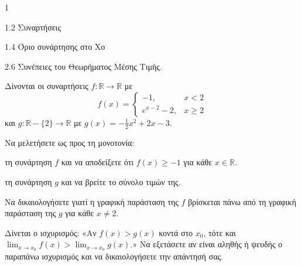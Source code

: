 \begin{ylh}{1}
    \item 1.2 Συναρτήσεις
    \item 1.4 Όριο συνάρτησης στο Χο
    \item 2.6 Συνέπειες του Θεωρήματος Μέσης Τιμής.
\end{ylh}
Δίνονται οι συναρτήσεις $f: \mathbb{R} \to \mathbb{R}$ με
\[ f(x) = \begin{cases} -1, & x < 2 \\ e^{x-2} - 2, & x \ge 2 \end{cases} \]
και $g: \mathbb{R} - \{2\} \to \mathbb{R}$ με $g(x) = -\frac{1}{2}x^2 + 2x - 3$.

\begin{alist}
\item Να μελετήσετε ως προς τη μονοτονία:
    \begin{rlist}
    \item τη συνάρτηση $f$ και να αποδείξετε ότι $f(x) \ge -1$ για κάθε $x \in \mathbb{R}$.
    \item τη συνάρτηση $g$ και να βρείτε το σύνολο τιμών της.
    \end{rlist}
\item Να δικαιολογήσετε γιατί η γραφική παράσταση της $f$ βρίσκεται πάνω από τη γραφική παράσταση της $g$ για κάθε $x \neq 2$.
\item Δίνεται ο ισχυρισμός:
    «Αν $f(x) > g(x)$ κοντά στο $x_0$, τότε και $\lim_{x \to x_0} f(x) > \lim_{x \to x_0} g(x)$.»
    Να εξετάσετε αν είναι αληθής ή ψευδής ο παραπάνω ισχυρισμός και να δικαιολογήσετε την απάντησή σας.
\end{alist}